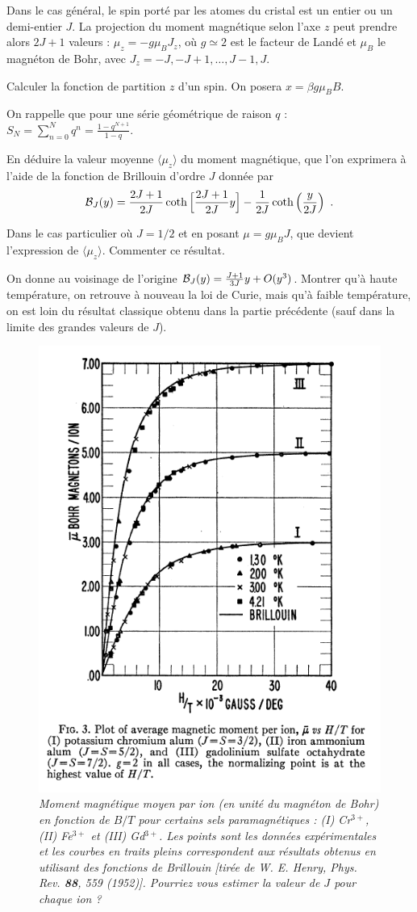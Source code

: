 \medskip


Dans le cas général, le spin porté par les atomes du cristal est un
entier ou un demi-entier $J$. La projection du moment magnétique selon
l'axe $z$ peut prendre alors $2J+1$ valeurs : $\mu_z= -g\mu_B J_z$, où
$g \simeq 2$ est le facteur de Landé et $\mu_B$ le magnéton de Bohr,
avec $J_z=-J, -J+1, \dots,J-1, J$.

\question
Calculer la fonction de partition $z$ d'un spin. On posera $x= \beta g \mu_B B$.

\noindent
On rappelle que pour une série géométrique de raison $q$ : $\displaystyle S_N=\sum_{n=0}^{N} q^n=\frac{1-q^{N+1}}{1-q}$.  

\question
En déduire la valeur moyenne $\langle \mu_z \rangle$ du moment magnétique, que l'on exprimera à l'aide de la fonction de Brillouin d'ordre $J$ donnée par
$$
{\cal B}_J(y)=\frac{2J+1}{2J} \coth \Big[\frac{2J+1}{2J}y\Big]-\frac{1}{2J}\coth \Big(\frac{y}{2J}\Big)\enspace.
$$

\question
Dans le cas particulier où $J=1/2$ et en posant $\mu = g\mu_B J$, que devient l'expression de $\langle \mu_z \rangle$. Commenter ce résultat. 

\question
On donne au voisinage de l'origine  ${\cal B}_J(y)= \frac{J+1}{3J} y+O(y^3)$. Montrer qu'à haute température, on retrouve à nouveau la loi de Curie, mais qu'à faible température, on est loin du résultat classique obtenu dans la partie précédente (sauf dans la limite des grandes valeurs de $J$).

\begin{figure}[h]
\begin{center} 
\includegraphics[height=.5\textwidth]{../Fig/Brillouin}
\caption{\it Moment magnétique moyen par ion (en unité du magnéton de Bohr) en fonction de $B/T$ pour certains sels paramagnétiques : (I) Cr$^{3+}$, (II) Fe$^{3+}$ et (III) Gd$^{3+}$.  Les points sont les données expérimentales et les courbes en traits pleins correspondent aux résultats obtenus en utilisant des fonctions de Brillouin [tirée de W. E. Henry, Phys. Rev. \textbf{88}, 559 (1952)]. Pourriez vous estimer la valeur de $J$ pour chaque ion ?}
\end{center} 
\end{figure}

